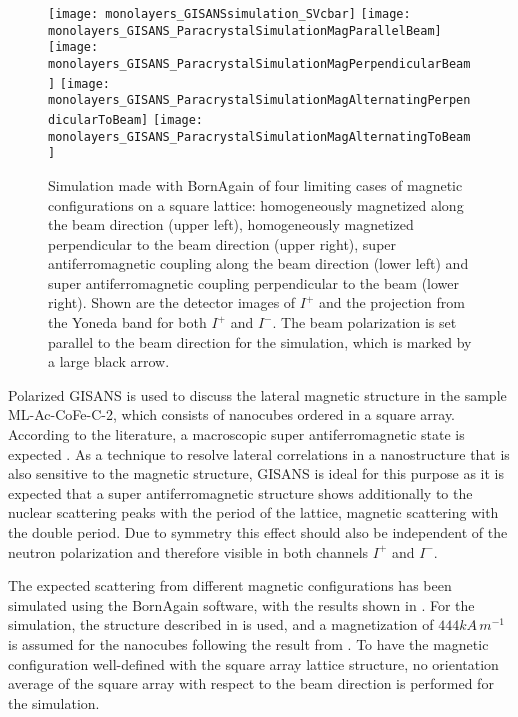 \documentclass[\main/dresen_thesis.tex]{subfiles}
\begin{document}
  \begin{figure}[htbp]
    \centering
    \texttt{[image: monolayers\_GISANSsimulation\_SVcbar]}
    \texttt{[image: monolayers\_GISANS\_ParacrystalSimulationMagParallelBeam]}
    \texttt{[image: monolayers\_GISANS\_ParacrystalSimulationMagPerpendicularBeam]}
    \texttt{[image: monolayers\_GISANS\_ParacrystalSimulationMagAlternatingPerpendicularToBeam]}
    \texttt{[image: monolayers\_GISANS\_ParacrystalSimulationMagAlternatingToBeam]}
    \caption{\label{fig:monolayers:gisans:simulationAlternating}Simulation made with BornAgain \cite{Burle_2018_borna} of four limiting cases of magnetic configurations on a square lattice: homogeneously magnetized along the beam direction (upper left), homogeneously magnetized perpendicular to the beam direction (upper right), super antiferromagnetic coupling along the beam direction (lower left) and super antiferromagnetic coupling perpendicular to the beam (lower right). Shown are the detector images of $I^{+}$ and the projection from the Yoneda band for both $I^{+}$ and $I^{-}$. The beam polarization is set parallel to the beam direction for the simulation, which is marked by a large black arrow.}
  \end{figure}
  Polarized GISANS is used to discuss the lateral magnetic structure in the sample ML-Ac-CoFe-C-2, which consists of nanocubes ordered in a square array.
  According to the literature, a macroscopic super antiferromagnetic state is expected \cite{Russier_2001_Calcu, Varon_2013_Dipol}.
  As a technique to resolve lateral correlations in a nanostructure that is also sensitive to the magnetic structure, GISANS is ideal for this purpose as it is expected that a super antiferromagnetic structure shows additionally to the nuclear scattering peaks with the period of the lattice, magnetic scattering with the double period.
  Due to symmetry this effect should also be independent of the neutron polarization and therefore visible in both channels $I^{+}$ and $I^{-}$.

  The expected scattering from different magnetic configurations has been simulated using the BornAgain software, with the results shown in .
  For the simulation, the structure described in  is used, and a magnetization of $444 \unit{kA \, m^{-1}}$ is assumed for the nanocubes following the result from .
  To have the magnetic configuration well-defined with the square array lattice structure, no orientation average of the square array with respect to the beam direction is performed for the simulation.
\end{document}

